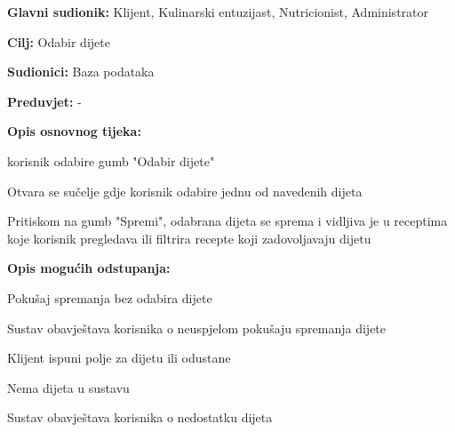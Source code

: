 					\noindent {}
					\begin{packed_item}
	
						\item \textbf{Glavni sudionik: }Klijent, Kulinarski entuzijast, Nutricionist, Administrator 
						\item  \textbf{Cilj:} Odabir dijete
						\item  \textbf{Sudionici:} Baza podataka
						\item  \textbf{Preduvjet:} -
						\item  \textbf{Opis osnovnog tijeka:} 
						
						\item[] \begin{packed_enum}
	
							\item korisnik odabire gumb "Odabir dijete"
							\item Otvara se sučelje gdje korisnik odabire jednu od navedenih dijeta
							\item Pritiskom na gumb "Spremi", odabrana dijeta se sprema i vidljiva je u receptima koje korisnik pregledava ili filtrira recepte koji zadovoljavaju dijetu
						\end{packed_enum}
						
						\item  \textbf{Opis mogućih odstupanja:}
						
						\item[] \begin{packed_item}
	
							\item[2.a] Pokušaj spremanja bez odabira dijete
							\item[] \begin{packed_enum}
								
								\item Sustav obavještava korisnika o neuspjelom pokušaju spremanja dijete
								\item Klijent ispuni polje za dijetu ili odustane
								
							\end{packed_enum}							
							\item[2.b] Nema dijeta u sustavu
							\item[] \begin{packed_enum}
								
								\item Sustav obavještava korisnika o nedostatku dijeta
								
							\end{packed_enum}

						\end{packed_item}
					\end{packed_item}





